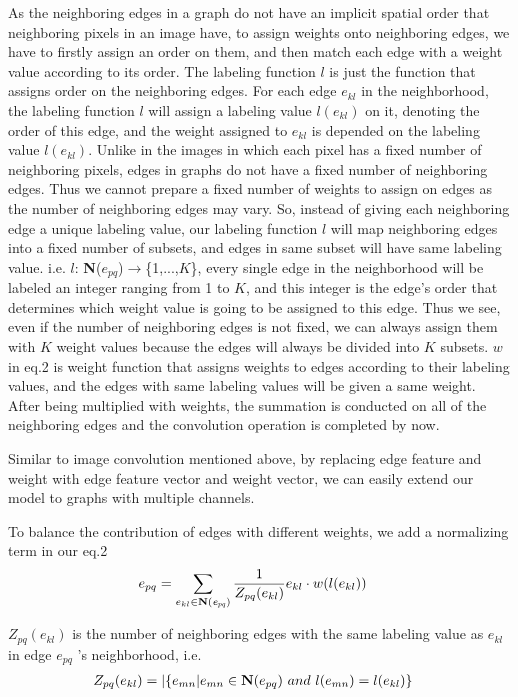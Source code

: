 \documentclass[a4paper,11pt]{article}
\begin{document}
As the neighboring edges in a graph do not have an implicit spatial order that neighboring pixels in an image have, to assign weights onto neighboring edges, we have to firstly assign an order on them, and then match each edge with a weight value according to its order. The labeling function $l$ is just the function that assigns order on the neighboring edges. For each edge $e_{kl}$ in the neighborhood, the labeling function $l$ will assign a labeling value $l(e_{kl})$ on it, denoting the order of this edge, and the weight assigned to $e_{kl}$ is depended on the labeling value $l(e_{kl})$. Unlike in the images in which each pixel has a fixed number of neighboring pixels, edges in graphs do not have a fixed number of neighboring edges. Thus we cannot prepare a fixed number of weights to assign on edges as the number of neighboring edges may vary. So, instead of giving each neighboring edge a unique labeling value, our labeling function $l$ will map neighboring edges into a fixed number of subsets, and edges in same subset will have same labeling value. i.e. $l$: {\bf N}($e_{pq}$)$\to$\{1,...,$K$\}, every single edge in the neighborhood will be labeled an integer ranging from 1 to $K$, and this integer is the edge's order that determines which weight value is going to be assigned to this edge. Thus we see, even if the number of neighboring edges is not fixed, we can always assign them with $K$ weight values because the edges will always be divided into $K$ subsets. $w$ in eq.2 is weight function that assigns weights to edges according to their labeling values, and the edges with same labeling values will be given a same weight. After being multiplied with weights, the summation is conducted on all of the neighboring edges and the convolution operation is completed by now.

Similar to image convolution mentioned above, by replacing edge feature and weight with edge feature vector and weight vector, we can easily extend our model to graphs with multiple channels.




To balance the contribution of edges with different weights, we add a normalizing term in our eq.2
\begin{align}
&e_{pq} = \sum_{e_{kl} \in {\bf N({\it e_{pq}})}} \frac{1}{Z_{pq}(e_{kl})} e_{kl} \cdot w(l(e_{kl})) &
\end{align}

{${Z_{pq}(e_{kl})}$} is the number of neighboring edges with the same labeling value as $e_{kl}$ in edge $e_{pq}$ 's neighborhood, i.e.
\begin{align}
&Z_{pq}(e_{kl}) = |  \{e_{mn}|e_{mn} \in{\bf N}(e_{pq}) \  and \  l(e_{mn})=l(e_{kl})\}  &
\end{align}
\end{document}
